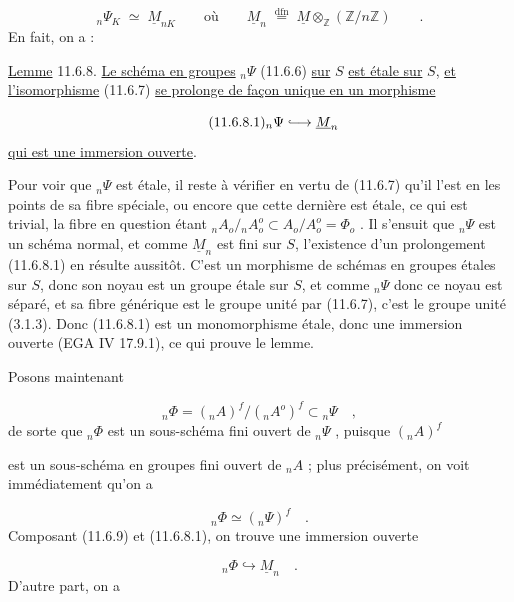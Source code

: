 \begin{equation}\tag{11.6.7}
{}_n\Psi_K \;\simeq\; \underline{M}_{nK} \qquad \mbox{où} \qquad \underline{M}_n \;\stackrel{\mathrm{dfn}}{=}\; \underline{M} \otimes_{\mathbb{Z}} (\mathbb{Z}/n\mathbb{Z}) \qquad .
\end{equation}
En fait, on a :

\underline{Lemme} 11.6.8. \underline{Le schéma en groupes} ${}_n\Psi$ (11.6.6) \underline{sur} $S$ \underline{est étale sur} $S$, \underline{et l'isomorphisme} (11.6.7) \underline{se prolonge de façon unique en un morphisme}

\begin{equation}\tag{11.6.8.1}
{}_n\Psi \lhook\joinrel\longrightarrow \underline{M}_n
\end{equation}
\underline{qui est une immersion ouverte}.

Pour voir que ${}_n\Psi$ est étale, il reste à vérifier en vertu de (11.6.7) qu'il l'est en les points de sa fibre spéciale, ou encore que cette dernière est étale, ce qui est trivial, la fibre en question étant ${}_nA_o/{}_nA_o^o \subset A_o/A_o^o = \Phi_o$ . Il s'ensuit que ${}_n\Psi$ est un schéma normal, et comme $\underline{M}_n$ est fini sur $S$, l'existence d'un prolongement (11.6.8.1) en résulte aussitôt. C'est un morphisme de schémas en groupes étales sur $S$, donc son noyau est un groupe étale sur $S$, et comme ${}_n\Psi$ donc ce noyau est séparé, et sa fibre générique est le groupe unité par (11.6.7), c'est le groupe unité (3.1.3). Donc (11.6.8.1) est un monomorphisme étale, donc une immersion ouverte (EGA IV 17.9.1), ce qui prouve le lemme.

Posons maintenant

\begin{equation}\tag{11.6.9}
{}_n\Phi = ({}_nA)^f/({}_nA^o)^f \subset {}_n\Psi \quad ,
\end{equation}
de sorte que ${}_n\Phi$ est un sous-schéma fini ouvert de ${}_n\Psi$ , puisque $({}_nA)^f$



est un sous-schéma en groupes fini ouvert de ${}_nA$ ; plus précisément, on voit immédiatement qu'on a

\begin{equation}\tag{11.6.10}
{}_n\Phi \simeq ({}_n\Psi)^f \quad .
\end{equation}
Composant (11.6.9) et (11.6.8.1), on trouve une immersion ouverte

\begin{equation}\tag{11.6.11}
{}_n\Phi \hookrightarrow \underline{M}_n \quad .
\end{equation}
D'autre part, on a

